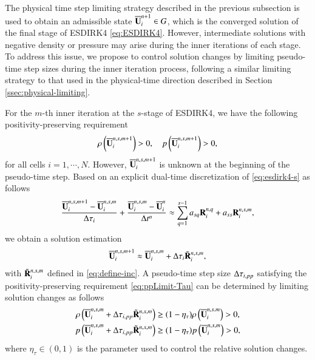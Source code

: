 The physical time step limiting strategy described in the previous subsection is used to obtain an admissible state $\overline{\mathbf{U}}_i^{n+1} \in G$, which is the converged solution of the final stage of ESDIRK4 \eqref{eq:ESDIRK4}. However, intermediate solutions with negative density or pressure may arise during the inner iterations of each stage. To address this issue, we propose to control solution changes by limiting pseudo-time step sizes during the inner iteration process, following a similar limiting strategy to that used in the physical-time direction described in Section \ref{ssec:physical-limiting}.

For the $m$-th inner iteration at the $s$-stage of ESDIRK4, we have the following positivity-preserving requirement
\begin{equation}
    \label{eq:ppLimit-Tau}
    \rho\left(\overline{\mathbf{U}}_i^{n,s,m+1} \right)>0, \quad
    p\left(\overline{\mathbf{U}}_i^{n,s,m+1}\right)>0,
\end{equation}
for all cells $i=1,\cdots,N$. However, $\overline{\mathbf{U}}^{n,s, m+1}_i$ is unknown at the beginning of the pseudo-time step. Based on an explicit dual-time  discretization of \eqref{eq:esdirk4-s} as follows
\begin{equation}
    \dfrac{\overline{\mathbf{U}}^{n,s,m+1}_i-\overline{\mathbf{U}}^{n,s,m}_i}{\mathrm\Delta \tau_i} + \dfrac{\overline{\mathbf{U}}^{n,s,m}_i - \overline{\mathbf{U}}^{n}_i}{\mathrm\Delta t^n} \approx \sum_{q=1}^{s-1} a_{sq} \mathbf{R}^{n,q}_i + a_{ss} \mathbf{R}_i^{n,s,m},
\end{equation}
we obtain a solution estimation
\begin{equation}
    \label{eq:estimation-dtau}
    \overline{\mathbf{U}}_i^{n,s,m+1} \approx  \overline{\mathbf{U}}_i^{n,s,m} + \mathrm\Delta \tau_i  \tilde{\mathbf{R}}_i^{n,s,m},
\end{equation}
with $ \tilde{\mathbf{R}}_i^{n,s,m}$ defined in \eqref{eq:define-inc}.
A pseudo-time step size $ \mathrm\Delta \tau_{i,pp}$ satisfying the positivity-preserving requirement \eqref{eq:ppLimit-Tau} can be determined by limiting solution changes as follows
\begin{equation}
    \label{eq:ppLimitDtau}
    \begin{aligned}
        \rho\left(\overline{\mathbf{U}}_i^{n,s,m} +  \mathrm\Delta \tau_{i,pp} \tilde{\mathbf{R}}_i^{n,s,m}\right)
         & \geq
        (1- \eta_\tau)
        \rho\left(\overline{\mathbf{U}}_i^{n,s.m}\right)
        >0, \\
        p\left(\overline{\mathbf{U}}_i^{n,s,m} + \mathrm\Delta  \tau_{i,pp} \tilde{\mathbf{R}}_i^{n,s,m}\right)
         & \geq
        (1- \eta_\tau)
        p\left(\overline{\mathbf{U}}_i^{n,s,m}\right)
        > 0,
    \end{aligned}
\end{equation}
where $\eta_\tau\in(0,1)$ is the parameter used to control the relative solution changes.

